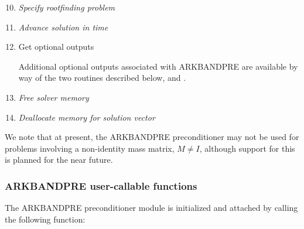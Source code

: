 \documentclass[letterpaper,10pt,english]{sphinxmanual}
\begin{document}
\begin{enumerate}
\setcounter{enumi}{9}
\item {} 
\emph{Specify rootfinding problem}

\item {} 
\emph{Advance solution in time}

\item {} 
Get optional outputs

Additional optional outputs associated with ARKBANDPRE are
available by way of the two routines described below,
{\hyperref[c_interface/Preconditioners:ARKBandPrecGetWorkSpace]{}} and
{\hyperref[c_interface/Preconditioners:ARKBandPrecGetNumRhsEvals]{}}.

\item {} 
\emph{Free solver memory}

\item {} 
\emph{Deallocate memory for solution vector}

\end{enumerate}

We note that at present, the ARKBANDPRE preconditioner may not be
used for problems involving a non-identity mass matrix, $M\ne
I$, although support for this is planned for the near future.


\subsubsection{ARKBANDPRE user-callable functions}
\label{c_interface/Preconditioners:arkbandpre-user-callable-functions}
The ARKBANDPRE preconditioner module is initialized and attached
by calling the following function:
\end{document}
